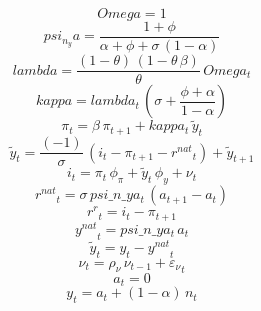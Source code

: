 \documentclass[10pt,a4paper]{article}
\begin{document}
\footnotesize
\begin{dmath*}
Omega = 1
\end{dmath*}
\begin{dmath*}
psi_n_ya = \frac{1+{\phi}}{{\alpha}+{\phi}+{\sigma}\, \left(1-{\alpha}\right)}
\end{dmath*}
\begin{dmath*}
lambda = \frac{\left(1-{\theta}\right)\, \left(1-{\theta}\, {\beta}\right)}{{\theta}}\, Omega_{t}
\end{dmath*}
\begin{dmath*}
kappa = lambda_{t}\, \left({\sigma}+\frac{{\phi}+{\alpha}}{1-{\alpha}}\right)
\end{dmath*}
\begin{dmath}
{\pi}_{t}={\beta}\, {\pi}_{t+1}+kappa_{t}\, {\tilde y}_{t}
\end{dmath}
\begin{dmath}
{\tilde y}_{t}=\frac{\left(-1\right)}{{\sigma}}\, \left({i}_{t}-{\pi}_{t+1}-{r^{nat}}_{t}\right)+{\tilde y}_{t+1}
\end{dmath}
\begin{dmath}
{i}_{t}={\pi}_{t}\, {\phi_{\pi}}+{\tilde y}_{t}\, {\phi_{y}}+{\nu}_{t}
\end{dmath}
\begin{dmath}
{r^{nat}}_{t}={\sigma}\, psi\_n\_ya_{t}\, \left({a}_{t+1}-{a}_{t}\right)
\end{dmath}
\begin{dmath}
{r^r}_{t}={i}_{t}-{\pi}_{t+1}
\end{dmath}
\begin{dmath}
{y^{nat}}_{t}=psi\_n\_ya_{t}\, {a}_{t}
\end{dmath}
\begin{dmath}
{\tilde y}_{t}={y}_{t}-{y^{nat}}_{t}
\end{dmath}
\begin{dmath}
{\nu}_{t}={\rho_{\nu}}\, {\nu}_{t-1}+{\varepsilon_\nu}_{t}
\end{dmath}
\begin{dmath}
{a}_{t}=0
\end{dmath}
\begin{dmath}
{y}_{t}={a}_{t}+\left(1-{\alpha}\right)\, {n}_{t}
\end{dmath}
\end{document}
